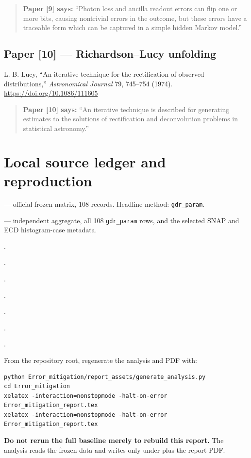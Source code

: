 \documentclass[10pt]{article}
\newcommand{\code}[1]{\texttt{#1}}
\newcommand{\paperquote}[2]{%
  \begin{quote}\small\textbf{Paper [#1] says:} ``#2''\end{quote}}
\begin{document}
\paperquote{9}{Photon loss and ancilla readout errors can flip one or more bits, causing nontrivial
errors in the outcome, but these errors have a traceable form which can be captured in a simple
hidden Markov model.}

\subsection*{Paper [10] --- Richardson--Lucy unfolding}
L. B. Lucy, ``An iterative technique for the rectification of observed distributions,''
\emph{Astronomical Journal} 79, 745--754 (1974).
\url{https://doi.org/10.1086/111605}

\paperquote{10}{An iterative technique is described for generating estimates to the solutions of
rectification and deconvolution problems in statistical astronomy.}

\section{Local source ledger and reproduction}

\begin{description}[style=nextline,leftmargin=1.4cm]
\item[D1]  --- official frozen matrix, 108 records. Headline method:
\code{gdr\_param}.
\item[D6]  --- independent aggregate, all 108
\code{gdr\_param} rows, and the selected SNAP and ECD histogram-case metadata.
\item[C1] .
\item[C2] .
\item[C3] .
\item[C4] .
\item[C5] .
\item[C6] .
\item[C7] .
\end{description}

From the repository root, regenerate the analysis and PDF with:
\begin{verbatim}
python Error_mitigation/report_assets/generate_analysis.py
cd Error_mitigation
xelatex -interaction=nonstopmode -halt-on-error Error_mitigation_report.tex
xelatex -interaction=nonstopmode -halt-on-error Error_mitigation_report.tex
\end{verbatim}

\textbf{Do not rerun the full baseline merely to rebuild this report.} The analysis reads the frozen
data and writes only under  plus the report PDF.
\end{document}
